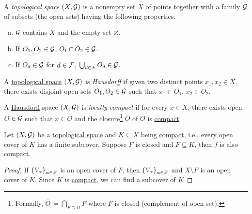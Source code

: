 \begin{definition}\label{def:topological-space}
	A \emph{topological space} \((X, \mathcal{\MakeUppercase{g}})\) is a nonempty set \(X\) of points together with a family \(\mathcal{\MakeUppercase{g}} \) of subsets (the open sets) having the following properties.
	\begin{enumerate}[(a)]
		\item \(\mathcal{\MakeUppercase{g}} \) contains \(X\) and the empty set \(\varnothing \).
		\item If \(O_1, O_2 \in \mathcal{\MakeUppercase{g}} \), \(O_1 \cap O_2\in \mathcal{\MakeUppercase{g}} \).
		\item If \(O_d \in \mathcal{\MakeUppercase{g}} \) for \(d\in \mathcal{\MakeUppercase{f}}\), \(\bigcup_{d\in \mathcal{\MakeUppercase{f}} } O_d \in \mathcal{\MakeUppercase{g}} \).
	\end{enumerate}
\end{definition}

\begin{definition}[Hausdorff]\label{def:Hausdorff}
	A \hyperref[def:topological-space]{topological space} \((X, \mathcal{\MakeUppercase{g}})\) is \emph{Hausdorff} if given two distinct points \(x_1, x_2\in X\), there exists disjoint open sets \(O_1, O_2\in \mathcal{\MakeUppercase{g}} \) such that \(x_1\in O_1\), \(x_2\in O_2\).
\end{definition}

\begin{definition}\label{def:locally-compact}
	A \hyperref[def:Hausdorff]{Hausdorff} space \((X, \mathcal{\MakeUppercase{g}})\) is \emph{locally compact} if for every \(x\in X\), there exists open \(O\in \mathcal{\MakeUppercase{g}} \) such that \(x\in O\) and the closure\footnote{Formally, \(\overline{O} \coloneqq \bigcap_{F \supseteq O} F\) where \(F\) is closed (complement of open set).} \(\overline{O} \) of \(O\) is \hyperref[def:compact]{compact}.
\end{definition}

\begin{theorem}
	Let \((X, \mathcal{\MakeUppercase{g}})\) be a \hyperref[def:topological-space]{topological space} and \(K \subseteq X\) being \hyperref[def:compact]{compact}, i.e., every open cover of \(K\) has a finite subcover. Suppose \(F\) is closed and \(F \subseteq K\), then \(f\) is also compact.
\end{theorem}
\begin{proof}
	If \(\left\{ V_\alpha \right\}_{\alpha \in \mathcal{\MakeUppercase{f}} } \) is an open cover of \(F\), then \(\left\{ V_\alpha  \right\}_{\alpha \in \mathcal{\MakeUppercase{f}} } \) and \(X\setminus F\) is an open cover of \(K\). Since \(K\) is \hyperref[def:compact]{compact}, we can find a subcover of \(K\)
\end{proof}

